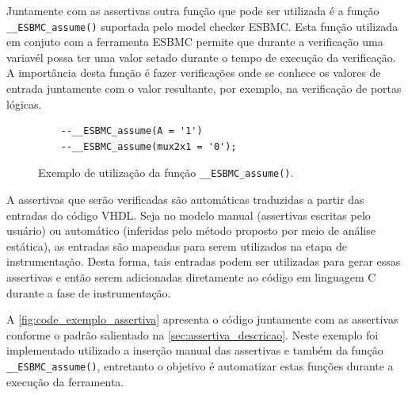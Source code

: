 \par

\par
Juntamente com as assertivas outra função que pode ser utilizada é a função \texttt{\_\_ESBMC\allowbreak{}\_assume()} suportada pelo model checker ESBMC. Esta função utilizada em conjuto com a ferramenta ESBMC permite que durante a verificação uma variavél possa ter uma valor setado durante o tempo de execução da verificação. A importância desta função é fazer verificações onde se conhece os valores de entrada juntamente com o valor resultante, por exemplo, na verificação de portas lógicas.

\begin{figure}[H]
\caption{\label{fig:assertiva} Exemplo de utilização da função \texttt{\_\_ESBMC\_assume()}.}
	\begin{center}
    \begin{minipage}{0.99\textwidth}
    \begin{lstlisting}       
    --__ESBMC_assume(A = '1')
    --__ESBMC_assume(mux2x1 = '0');
    \end{lstlisting}
    \end{minipage}
	\end{center}
\end{figure}

\par
A assertivas que serão verificadas são automáticas traduzidas a partir das entradas do código VHDL. Seja no modelo manual (assertivas escritas pelo usuário) ou automático (inferidas pelo método proposto por meio de análise estática), as entradas são mapeadas para serem utilizados na etapa de instrumentação. Desta forma, tais entradas podem ser utilizadas para gerar essas assertivas e então serem adicionadas diretamente ao código em linguagem C durante a fase de instrumentação. 

\par
A \autoref{fig:code_exemplo_assertiva} apresenta o código juntamente com as assertivas conforme o padrão salientado na \autoref{sec:assertiva_descricao}. Neste exemplo foi implementado utilizado a inserção manual das assertivas e também da função \texttt{\_\_ESBMC\_assume()}, entretanto o objetivo é automatizar estas funções durante a execução da ferramenta.

